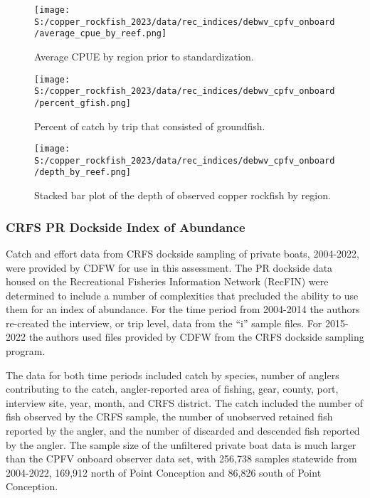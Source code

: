 \documentclass[11pt,
  letterpaper,
]{article}
\begin{document}
\newpage

\begin{figure}
{\centering
\texttt{[image: S:/copper\_rockfish\_2023/data/rec\_indices/debwv\_cpfv\_onboard/average\_cpue\_by\_reef.png]}
}
\caption{Average CPUE by region prior to standardization.\label{fig:deb-regioncpue}}
\end{figure}

\newpage

\begin{figure}
{\centering
\texttt{[image: S:/copper\_rockfish\_2023/data/rec\_indices/debwv\_cpfv\_onboard/percent\_gfish.png]}
}
\caption{Percent of catch by trip that consisted of groundfish.\label{fig:deb-percent-gfish}}
\end{figure}

\newpage

\begin{figure}
{\centering
\texttt{[image: S:/copper\_rockfish\_2023/data/rec\_indices/debwv\_cpfv\_onboard/depth\_by\_reef.png]}
}
\caption{Stacked bar plot of the depth of observed copper rockfish by region.\label{fig:deb-depths}}
\end{figure}

\newpage

\subsubsection{CRFS PR Dockside Index of Abundance}\label{crfs-pr-index}

Catch and effort data from CRFS dockside sampling of private boats, 2004-2022, were provided by CDFW for use in this assessment. The PR dockside data housed on the Recreational Fisheries Information Network (RecFIN) were determined to include a number of complexities that precluded the ability to use them for an index of abundance. For the time period from 2004-2014 the authors re-created the interview, or trip level, data from the ``i'' sample files. For 2015-2022 the authors used files provided by CDFW from the CRFS dockside sampling program.

The data for both time periods included catch by species, number of anglers contributing to the catch, angler-reported area of fishing, gear, county, port, interview site, year, month, and CRFS district. The catch included the number of fish observed by the CRFS sample, the number of unobserved retained fish reported by the angler, and the number of discarded and descended fish reported by the angler. The sample size of the unfiltered private boat data is much larger than the CPFV onboard observer data set, with 256,738 samples statewide from 2004-2022, 169,912 north of Point Conception and 86,826 south of Point Conception.
\end{document}
